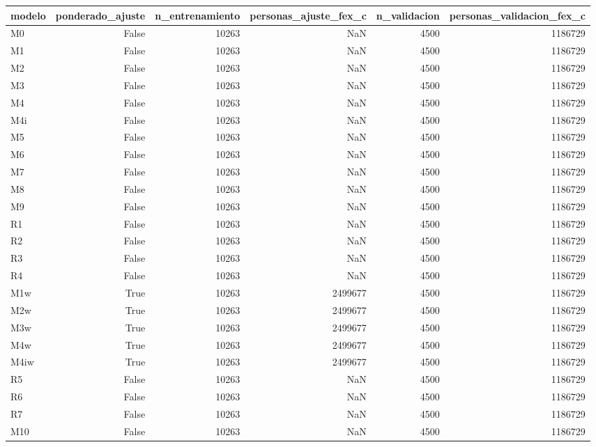 \begin{tabular}{lrrrrr}
\toprule
modelo & ponderado\_ajuste & n\_entrenamiento & personas\_ajuste\_fex\_c & n\_validacion & personas\_validacion\_fex\_c \\
\midrule
M0 & False & 10263 & NaN & 4500 & 1186729 \\
M1 & False & 10263 & NaN & 4500 & 1186729 \\
M2 & False & 10263 & NaN & 4500 & 1186729 \\
M3 & False & 10263 & NaN & 4500 & 1186729 \\
M4 & False & 10263 & NaN & 4500 & 1186729 \\
M4i & False & 10263 & NaN & 4500 & 1186729 \\
M5 & False & 10263 & NaN & 4500 & 1186729 \\
M6 & False & 10263 & NaN & 4500 & 1186729 \\
M7 & False & 10263 & NaN & 4500 & 1186729 \\
M8 & False & 10263 & NaN & 4500 & 1186729 \\
M9 & False & 10263 & NaN & 4500 & 1186729 \\
R1 & False & 10263 & NaN & 4500 & 1186729 \\
R2 & False & 10263 & NaN & 4500 & 1186729 \\
R3 & False & 10263 & NaN & 4500 & 1186729 \\
R4 & False & 10263 & NaN & 4500 & 1186729 \\
M1w & True & 10263 & 2499677 & 4500 & 1186729 \\
M2w & True & 10263 & 2499677 & 4500 & 1186729 \\
M3w & True & 10263 & 2499677 & 4500 & 1186729 \\
M4w & True & 10263 & 2499677 & 4500 & 1186729 \\
M4iw & True & 10263 & 2499677 & 4500 & 1186729 \\
R5 & False & 10263 & NaN & 4500 & 1186729 \\
R6 & False & 10263 & NaN & 4500 & 1186729 \\
R7 & False & 10263 & NaN & 4500 & 1186729 \\
M10 & False & 10263 & NaN & 4500 & 1186729 \\
\bottomrule
\end{tabular}
